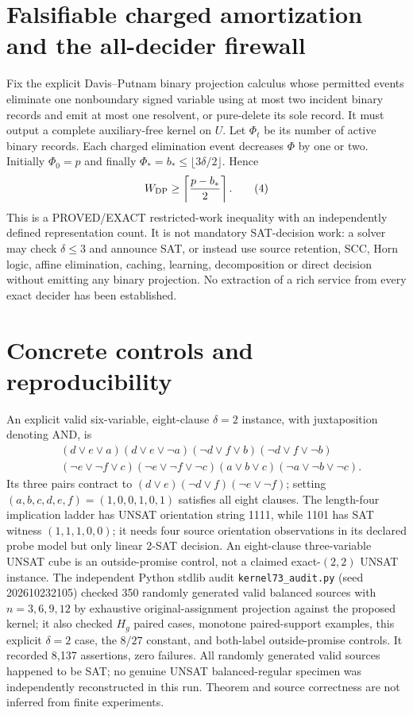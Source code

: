 \documentclass[11pt]{article}
\begin{document}
\section{Falsifiable charged amortization and the all-decider firewall}
Fix the explicit Davis--Putnam binary projection calculus whose permitted events eliminate one nonboundary signed variable using at most two incident binary records and emit at most one resolvent, or pure-delete its sole record. It must output a complete auxiliary-free kernel on $U$. Let $\Phi_t$ be its number of active binary records. Each charged elimination event decreases $\Phi$ by one or two. Initially $\Phi_0=p$ and finally $\Phi_*=b_*\le\lfloor3\delta/2\rfloor$. Hence
\[
W_{\rm DP}\ge\left\lceil\frac{p-b_*}{2}\right\rceil.
\tag{4}
\]
This is a PROVED/EXACT restricted-work inequality with an independently defined representation count. It is not mandatory SAT-decision work: a solver may check $\delta\le3$ and announce SAT, or instead use source retention, SCC, Horn logic, affine elimination, caching, learning, decomposition or direct decision without emitting any binary projection. No extraction of a rich service from every exact decider has been established.

\section{Concrete controls and reproducibility}
An explicit valid six-variable, eight-clause $\delta=2$ instance, with juxtaposition denoting AND, is
\[
\begin{split}
&(d\vee e\vee a)(d\vee e\vee\neg a)
(\neg d\vee f\vee b)(\neg d\vee f\vee\neg b)\\
&(\neg e\vee\neg f\vee c)(\neg e\vee\neg f\vee\neg c)
(a\vee b\vee c)(\neg a\vee\neg b\vee\neg c).
\end{split}
\]
Its three pairs contract to $(d\vee e)(\neg d\vee f)(\neg e\vee\neg f)$; setting $(a,b,c,d,e,f)=(1,0,0,1,0,1)$ satisfies all eight clauses. The length-four implication ladder has UNSAT orientation string 1111, while 1101 has SAT witness $(1,1,1,0,0)$; it needs four source orientation observations in its declared probe model but only linear 2-SAT decision. An eight-clause three-variable UNSAT cube is an outside-promise control, not a claimed exact-$(2,2)$ UNSAT instance.
The independent Python stdlib audit \texttt{kernel73\_audit.py} (seed 202610232105) checked 350 randomly generated valid balanced sources with $n=3,6,9,12$ by exhaustive original-assignment projection against the proposed kernel; it also checked $H_g$ paired cases, monotone paired-support examples, this explicit $\delta=2$ case, the $8/27$ constant, and both-label outside-promise controls. It recorded 8,137 assertions, zero failures. All randomly generated valid sources happened to be SAT; no genuine UNSAT balanced-regular specimen was independently reconstructed in this run. Theorem and source correctness are not inferred from finite experiments.
\end{document}
